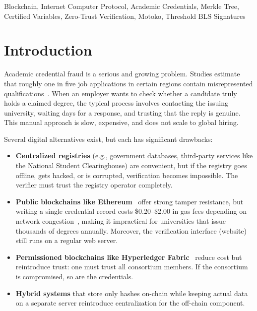\documentclass[conference]{IEEEtran}
\begin{document}
\begin{IEEEkeywords}
Blockchain, Internet Computer Protocol, Academic Credentials, Merkle Tree, Certified Variables, Zero-Trust Verification, Motoko, Threshold BLS Signatures
\end{IEEEkeywords}

\section{Introduction}
\label{sec:intro}

Academic credential fraud is a serious and growing problem. Studies estimate that roughly one in five job applications in certain regions contain misrepresented qualifications~\cite{chahal2021credential}. When an employer wants to check whether a candidate truly holds a claimed degree, the typical process involves contacting the issuing university, waiting days for a response, and trusting that the reply is genuine. This manual approach is slow, expensive, and does not scale to global hiring.

Several digital alternatives exist, but each has significant drawbacks:

\begin{itemize}[leftmargin=*]
  \item \textbf{Centralized registries} (e.g., government databases, third-party services like the National Student Clearinghouse) are convenient, but if the registry goes offline, gets hacked, or is corrupted, verification becomes impossible. The verifier must trust the registry operator completely.
  \item \textbf{Public blockchains like Ethereum}~\cite{buterin2014ethereum} offer strong tamper resistance, but writing a single credential record costs \$0.20--\$2.00 in gas fees depending on network congestion~\cite{wood2014ethereum}, making it impractical for universities that issue thousands of degrees annually. Moreover, the verification interface (website) still runs on a regular web server.
  \item \textbf{Permissioned blockchains like Hyperledger Fabric}~\cite{androulaki2018fabric} reduce cost but reintroduce trust: one must trust all consortium members. If the consortium is compromised, so are the credentials.
  \item \textbf{Hybrid systems} that store only hashes on-chain while keeping actual data on a separate server reintroduce centralization for the off-chain component.
\end{itemize}
\end{document}
